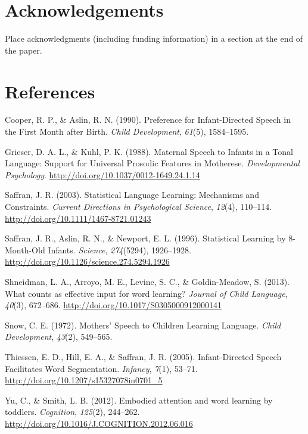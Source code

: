 \documentclass[10pt, letterpaper]{article}
\begin{document}
\section{Acknowledgements}\label{acknowledgements}

Place acknowledgments (including funding information) in a section at
the end of the paper.

\section{References}\label{references}

\setlength{\parindent}{-0.1in} \setlength{\leftskip}{0.125in} \noindent

\hypertarget{refs}{}
\hypertarget{ref-Cooper1990}{}
Cooper, R. P., \& Aslin, R. N. (1990). Preference for Infant-Directed
Speech in the First Month after Birth. \emph{Child Development},
\emph{61}(5), 1584--1595.

\hypertarget{ref-Grieser1988}{}
Grieser, D. A. L., \& Kuhl, P. K. (1988). Maternal Speech to Infants in
a Tonal Language: Support for Universal Prosodic Features in Motherese.
\emph{Developmental Psychology}.
\url{http://doi.org/10.1037/0012-1649.24.1.14}

\hypertarget{ref-Saffran2003}{}
Saffran, J. R. (2003). Statistical Language Learning: Mechanisms and
Constraints. \emph{Current Directions in Psychological Science},
\emph{12}(4), 110--114. \url{http://doi.org/10.1111/1467-8721.01243}

\hypertarget{ref-Saffran1996}{}
Saffran, J. R., Aslin, R. N., \& Newport, E. L. (1996). Statistical
Learning by 8-Month-Old Infants. \emph{Science}, \emph{274}(5294),
1926--1928. \url{http://doi.org/10.1126/science.274.5294.1926}

\hypertarget{ref-Shneidman2013}{}
Shneidman, L. A., Arroyo, M. E., Levine, S. C., \& Goldin-Meadow, S.
(2013). What counts as effective input for word learning? \emph{Journal
of Child Language}, \emph{40}(3), 672--686.
\url{http://doi.org/10.1017/S0305000912000141}

\hypertarget{ref-Snow1972}{}
Snow, C. E. (1972). Mothers' Speech to Children Learning Language.
\emph{Child Development}, \emph{43}(2), 549--565.

\hypertarget{ref-Thiessen2005}{}
Thiessen, E. D., Hill, E. A., \& Saffran, J. R. (2005). Infant-Directed
Speech Facilitates Word Segmentation. \emph{Infancy}, \emph{7}(1),
53--71. \url{http://doi.org/10.1207/s15327078in0701_5}

\hypertarget{ref-Yu2012}{}
Yu, C., \& Smith, L. B. (2012). Embodied attention and word learning by
toddlers. \emph{Cognition}, \emph{125}(2), 244--262.
\url{http://doi.org/10.1016/J.COGNITION.2012.06.016}
\end{document}
